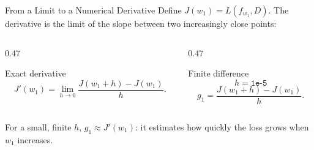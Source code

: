 \documentclass[aspectratio=169]{beamer}
\begin{document}
\begin{frame}{From a Limit to a Numerical Derivative}
  Define $J(w_1)=L(f_{w_1},D)$. The derivative is the limit of the slope
  between two increasingly close points:

  \begin{columns}[T]
    \begin{column}{0.47\textwidth}
      \begin{block}{Exact derivative}
        \begin{equation*}
          J'(w_1)
          =
          \lim_{h \to 0}
          \frac{J(w_1 + h) - J(w_1)}{h}.
        \end{equation*}
      \end{block}
    \end{column}
    \begin{column}{0.47\textwidth}
      \begin{block}{Finite difference}
        \begin{equation*}
          h = \texttt{1e-5}
        \end{equation*}
        \begin{equation*}
          g_1
          =
          \frac{J(w_1 + h) - J(w_1)}{h}.
        \end{equation*}
      \end{block}
    \end{column}
  \end{columns}

  For a small, finite $h$, $g_1 \approx J'(w_1)$: it estimates how quickly
  the loss grows when $w_1$ increases.
\end{frame}
\end{document}
